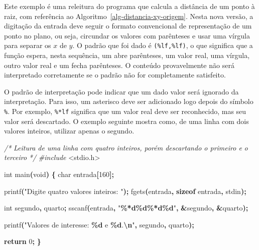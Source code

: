 \documentclass[
  11pt,
  a4paper,
]{scrbook}
\newenvironment{Shaded}{\begin{snugshade}}{\end{snugshade}}
\newcommand{\CommentTok}[1]{\textcolor[rgb]{0.56,0.35,0.01}{\textit{#1}}}
\newcommand{\ControlFlowTok}[1]{\textcolor[rgb]{0.13,0.29,0.53}{\textbf{#1}}}
\newcommand{\DataTypeTok}[1]{\textcolor[rgb]{0.13,0.29,0.53}{#1}}
\newcommand{\DecValTok}[1]{\textcolor[rgb]{0.00,0.00,0.81}{#1}}
\newcommand{\ImportTok}[1]{#1}
\newcommand{\KeywordTok}[1]{\textcolor[rgb]{0.13,0.29,0.53}{\textbf{#1}}}
\newcommand{\NormalTok}[1]{#1}
\newcommand{\OperatorTok}[1]{\textcolor[rgb]{0.81,0.36,0.00}{\textbf{#1}}}
\newcommand{\PreprocessorTok}[1]{\textcolor[rgb]{0.56,0.35,0.01}{\textit{#1}}}
\newcommand{\SpecialCharTok}[1]{\textcolor[rgb]{0.81,0.36,0.00}{\textbf{#1}}}
\newcommand{\StringTok}[1]{\textcolor[rgb]{0.31,0.60,0.02}{#1}}
\begin{document}
Este exemplo é uma releitura do programa que calcula a distância de um
ponto à raiz, com referência ao Algoritmo~\ref{alg-distancia-xy-origem}.
Nesta nova versão, a digitação da entrada deve seguir o formato
convencional de representação de um ponto no plano, ou seja, circundar
os valores com parênteses e usar uma vírgula para separar os \(x\) de
\(y\). O padrão que foi dado é \texttt{(\%lf,\%lf)}, o que significa que
a função espera, nesta sequência, um abre parênteses, um valor real, uma
vírgula, outro valor real e um fecha parênteses. O conteúdo
provavelmente não será interpretado corretamente se o padrão não for
completamente satisfeito.

O padrão de interpretação pode indicar que um dado valor será ignorado
da interpretação. Para isso, um asterisco deve ser adicionado logo
depois do símbolo \texttt{\%}. Por exemplo, \texttt{\%*lf} significa que
um valor real deve ser reconhecido, mas seu valor será descartado. O
exemplo seguinte mostra como, de uma linha com dois valores inteiros,
utilizar apenas o segundo.

\begin{Shaded}
\begin{Highlighting}[]
\CommentTok{/*}
\CommentTok{Leitura de uma linha com quatro inteiros, porém descartando o primeiro e}
\CommentTok{o terceiro}
\CommentTok{*/}
\PreprocessorTok{\#include }\ImportTok{\textless{}stdio.h\textgreater{}}

\DataTypeTok{int}\NormalTok{ main}\OperatorTok{(}\DataTypeTok{void}\OperatorTok{)} \OperatorTok{\{}
    \DataTypeTok{char}\NormalTok{ entrada}\OperatorTok{[}\DecValTok{160}\OperatorTok{];}

\NormalTok{    printf}\OperatorTok{(}\StringTok{"Digite quatro valores inteiros: "}\OperatorTok{);}
\NormalTok{    fgets}\OperatorTok{(}\NormalTok{entrada}\OperatorTok{,} \KeywordTok{sizeof}\NormalTok{ entrada}\OperatorTok{,}\NormalTok{ stdin}\OperatorTok{);}

    \DataTypeTok{int}\NormalTok{ segundo}\OperatorTok{,}\NormalTok{ quarto}\OperatorTok{;}
\NormalTok{    sscanf}\OperatorTok{(}\NormalTok{entrada}\OperatorTok{,} \StringTok{"}\SpecialCharTok{\%*d\%d\%*d\%d}\StringTok{"}\OperatorTok{,} \OperatorTok{\&}\NormalTok{segundo}\OperatorTok{,} \OperatorTok{\&}\NormalTok{quarto}\OperatorTok{);}

\NormalTok{    printf}\OperatorTok{(}\StringTok{"Valores de interesse: }\SpecialCharTok{\%d}\StringTok{ e }\SpecialCharTok{\%d}\StringTok{.}\SpecialCharTok{\textbackslash{}n}\StringTok{"}\OperatorTok{,}\NormalTok{ segundo}\OperatorTok{,}\NormalTok{ quarto}\OperatorTok{);}

    \ControlFlowTok{return} \DecValTok{0}\OperatorTok{;}
\OperatorTok{\}}
\end{Highlighting}
\end{Shaded}
\end{document}
